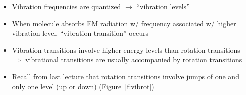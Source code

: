 \documentclass[11pt, oneside]{article}
\begin{document}
\begin{itemize}
\begin{figure}[!htbp]
	\caption{Basic process of molecular vibration driven by EM radiation.}
	\label{f:vib}
\end{figure}

	\item[--] Vibration frequencies are quantized $\rightarrow$ ``vibration levels''
	\item[--] When molecule absorbs EM radiation w/ frequency associated w/ higher vibration level, ``vibration transition'' occurs
	\item[--] Vibration transitions involve higher energy levels than rotation transitions $\Rightarrow$ \uline{vibrational transitions are usually accompanied by rotation transitions}
	\item[--] Recall from last lecture that rotation transitions involve jumps of \underline{one and only one} level (up or down) (Figure~\ref{f:vibrot})


\end{itemize}
\end{document}
